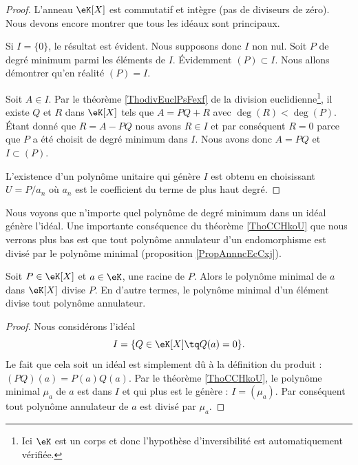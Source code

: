 \begin{proof}
    L'anneau \( \eK[X]\) est commutatif et intègre (pas de diviseurs de zéro). Nous devons encore montrer que tous les idéaux sont principaux.

    Si \( I=\{ 0 \}\), le résultat est évident. Nous supposons donc \( I\) non nul. Soit \( P\) de degré minimum parmi les éléments de \( I\). Évidemment \( (P)\subset I\). Nous allons démontrer qu'en réalité \( (P)=I\).

    Soit \( A\in I\). Par le théorème \ref{ThodivEuclPsFexf} de la division euclidienne\footnote{Ici \( \eK\) est un corps et donc l'hypothèse d'inversibilité est automatiquement vérifiée.}, il existe \( Q\) et \( R\) dans \( \eK[X]\) tels que \( A=PQ+R\) avec \( \deg(R)<\deg(P)\). Étant donné que \( R=A-PQ\) nous avons \( R\in I\) et par conséquent \( R=0\) parce que \( P\) a été choisit de degré minimum dans \( I\). Nous avons donc \( A=PQ\) et \( I\subset (P)\).

    L'existence d'un polynôme unitaire qui génère \( I\) est obtenu en choisissant \( U=P/a_n\) où \( a_n\) est le coefficient du terme de plus haut degré.
\end{proof}
Nous voyons que n'importe quel polynôme de degré minimum dans un idéal génère l'idéal. Une importante conséquence du théorème \ref{ThoCCHkoU} que nous verrons plus bas est que tout polynôme annulateur d'un endomorphisme est divisé par le polynôme minimal (proposition \ref{PropAnnncEcCxj}).

\begin{corollary}
    Soit \( P\in \eK[X]\) et \( a\in \eK\), une racine de \( P\). Alors le polynôme minimal de \( a\) dans \( \eK[X]\) divise \( P\). En d'autre termes, le polynôme minimal d'un élément divise tout polynôme annulateur.
\end{corollary}

\begin{proof}
    Nous considérons l'idéal
    \begin{equation}
        I=\{ Q\in \eK[X]\tq Q(a)=0 \}.
    \end{equation}
    Le fait que cela soit un idéal est simplement dû à la définition du produit : \( (PQ)(a)=P(a)Q(a)\). Par le théorème \ref{ThoCCHkoU}, le polynôme minimal \( \mu_a\) de \( a\) est dans \( I\) et qui plus est le génère : \( I=(\mu_a)\). Par conséquent tout polynôme annulateur de \( a\) est divisé par \( \mu_a\).
\end{proof}


